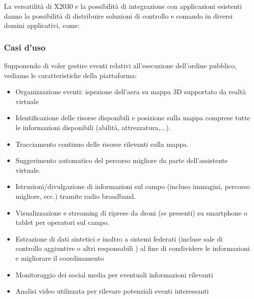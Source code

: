 La versatilità di X2030 e la possibilità di integrazione
con applicazioni esistenti danno la possibilità di distribuire 
soluzioni di controllo e comando in diversi domini applicativi,
come:





\subsubsection{Casi d'uso}
Supponendo di voler gestire eventi relativi all'esecuzione 
dell'ordine pubblico, vediamo le caratteristiche della piattaforma:

\begin{itemize}
    \item Organizzazione eventi: ispezione dell'aera su mappa 3D
    supportato da realtà virtuale
    \item Identificazione delle risorse disponibili e posizione sulla mappa
    comprese tutte le informazioni disponibili (abilità, attrezzatura,...).
    \item Tracciamento continuo delle risorse rilevanti sulla mappa.
    \item Suggerimento automatico del percorso migliore da parte dell'assistente virtuale.
    \item Istruzioni/divulgazione di informazioni sul campo (incluso
    immagini, percorso migliore, ecc.) tramite radio broadband.
    \item Visualizzazione e streaming di riprese da droni (se presenti) su
    smartphone o tablet per operatori sul campo.
    \item Estrazione di dati sintetici e inoltro a sistemi federati
    (incluse sale di controllo aggiuntive o altri responsabili )
    al fine di condividere le informazioni e migliorare il coordinamento
    \item Monitoraggio dei social media per eventuali informazioni rilevanti
    \item Analisi video utilizzata per rilevare potenziali eventi interessanti
\end{itemize}
\pagebreak

